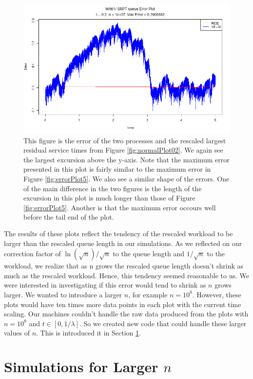 \documentclass[12pt]{article}
\theoremstyle{plain}
\theoremstyle{definition}
\theoremstyle{remark}
\begin{document}
\begin{figure}[H]
\centering
\includegraphics[width = \textwidth]{Pictures/errorPlot02.png}
\caption{This figure is the error of the two processes and the rescaled largest residual service times from Figure \ref{fig:normalPlot02}. We again see the largest excursion above the y-axis. Note that the maximum error presented in this plot is fairly similar to the maximum error in Figure \ref{fig:errorPlot5}. We also see a similar shape of the errors. One of the main difference in the two figures is the length of the excursion in this plot is much longer than those of Figure \ref{fig:errorPlot5}. Another is that the maximum error occours well before the tail end of the plot.}
\label{fig:errorPlot02}
\end{figure}

The results of these plots reflect the tendency of the rescaled workload to be larger than the rescaled queue length in our simulations. As we reflected on our correction factor of $\ln ( \sqrt{n})/\sqrt{n}$ to the queue length and $1/\sqrt{n}$ to the workload, we realize that as n grows the rescaled queue length doesn't shrink as much as the rescaled workload. Hence, this tendency seemed reasonable to us. We were interested in investigating if this error would tend to shrink as $n$ grows larger. We wanted to introduce a larger $n$, for example $n = 10^8$. However, these plots would have ten times more data points in each plot with the current time scaling. Our machines couldn't handle the raw data produced from the plots with $n=10^8$ and $t \in [0,1/\lambda]$. So we created new code that could handle these larger values of $n$. This is introduced it in Section \ref{sec:tables}.


\section{Simulations for Larger $n$} \label{sec:tables}
\end{document}
